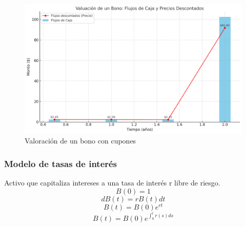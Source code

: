\begin{frame}
    \begin{figure}[h]
       \centering
       \includegraphics[width=\textwidth]{img/cap1/bono_cupon.jpg}
       \caption{Valoración de un bono con cupones}
       \label{bono_cupon}
   \end{figure}
\end{frame}

\begin{frame}
    \frametitle{Modelo de tasas de interés}
    \begin{defin}
        Activo que capitaliza intereses a una tasa de interés r libre de riesgo.\\
        \begin{equation*}
            B(0) = 1 
        \end{equation*}
        \begin{equation*}
            dB(t) = rB(t)dt
        \end{equation*}
        \begin{equation*}
            B(t) = B(0)e^{rt}
        \end{equation*}
        \begin{equation*}
            B(t) = B(0)e^{\int_0^t r(s)ds}
        \end{equation*}
    \end{defin}
\end{frame}


